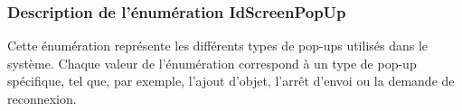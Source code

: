 \subsubsection{Description de l'énumération  IdScreenPopUp}

Cette énumération représente les différents types de pop-ups utilisés dans le système. Chaque valeur de l'énumération correspond à un type de pop-up spécifique, tel que, par exemple, l'ajout d'objet, l'arrêt d'envoi ou la demande de reconnexion.
\newline